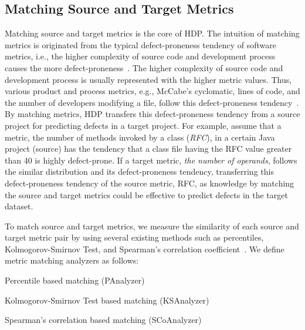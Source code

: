 \subsection{Matching Source and Target Metrics}
\label{sec:analyzers}

Matching source and target metrics is the core of HDP.
The intuition of matching metrics is originated from the typical defect-proneness tendency of software metrics, i.e., the higher complexity of source code and development process causes the more defect-proneness~\cite{Menzies07,DAmbros12,nam2015clami}. The higher complexity of source code and development process is usually represented with the higher metric values. Thus, various product and process metrics, e.g., McCabe's cyclomatic, lines of code, and the number of developers modifying a file, follow this defect-proneness tendency~\cite{Bird2011,DAmbros12,Menzies07,Ohlsson1996,Rahman13}. By matching metrics, HDP transfers this defect-proneness tendency from a source project for predicting defects in a target project. For example, assume that a metric, the number of methods invoked by a class ({\em RFC}), in a certain Java project (source) has the tendency that a class file having the RFC value greater than 40 is highly defect-prone. If a target metric, {\em the number of operands}, follows the similar distribution and its defect-proneness tendency, transferring this defect-proneness tendency of the source metric, RFC, as knowledge by matching the source and target metrics could be effective to predict defects in the target dataset.

To match source and target metrics, we measure the similarity of each source and
target metric pair by using several existing methods such as percentiles,
Kolmogorov-Smirnov Test, and Spearman's correlation
coefficient~\cite{Massey51,Spearman10}.
We define metric matching analyzers as follows:
\squishlist
	\item Percentile based matching (PAnalyzer)
	\item Kolmogorov-Smirnov Test based matching (KSAnalyzer)
	\item Spearman's correlation based matching (SCoAnalyzer)
\squishend

